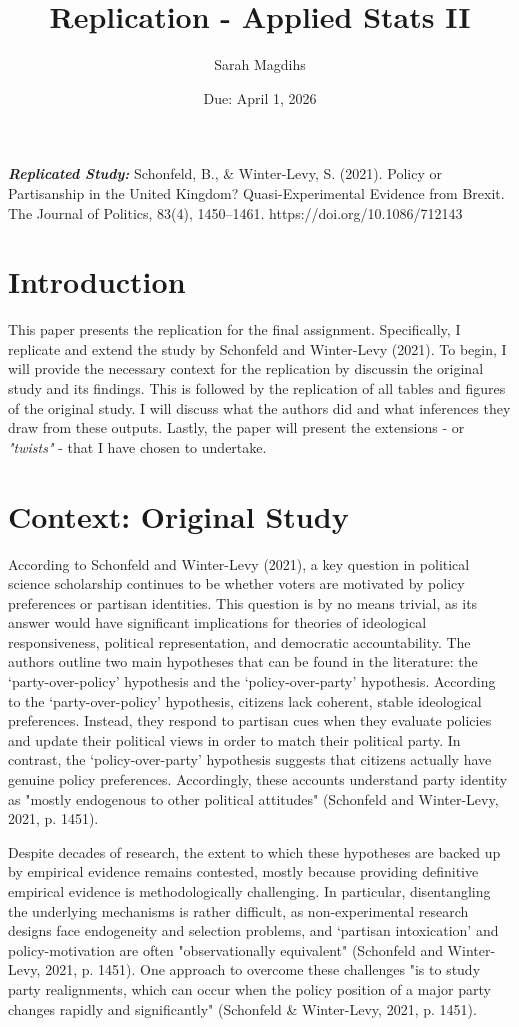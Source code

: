 \documentclass[12pt,letterpaper]{article}
\title{Replication - Applied Stats II}
\date{Due: April 1, 2026}
\author{Sarah Magdihs}
\begin{document}
	\maketitle
	\textbf{\textit{Replicated Study:}} Schonfeld, B., \& Winter-Levy, S. (2021). Policy or Partisanship in the United Kingdom? Quasi-Experimental Evidence from Brexit. The Journal of Politics, 83(4), 1450–1461. https://doi.org/10.1086/712143
	\section{Introduction}
	This paper presents the replication for the final assignment. Specifically, I replicate and extend the study by Schonfeld and Winter-Levy (2021). To begin, I will provide the necessary context for the replication by discussin the original study and its findings. This is followed by the replication of all tables and figures of the original study. I will discuss what the authors did and what inferences they draw from these outputs. Lastly, the paper will present the extensions - or \textit{"twists"} - that I have chosen to undertake.
	
	\section{Context: Original Study}
	According to Schonfeld and Winter-Levy (2021), a key question in political science scholarship continues to be whether voters are motivated by policy preferences or partisan identities. This question is by no means trivial, as its answer would have significant implications for theories of ideological responsiveness, political representation, and democratic accountability. The authors outline two main hypotheses that can be found in the literature: the ‘party-over-policy’ hypothesis and the ‘policy-over-party’ hypothesis. According to the ‘party-over-policy’ hypothesis, citizens lack coherent, stable ideological preferences. Instead, they respond to partisan cues when they evaluate policies and update their political views in order to match their political party. In contrast, the ‘policy-over-party’ hypothesis suggests that citizens actually have genuine policy preferences. Accordingly, these accounts understand party identity as "mostly endogenous to other political attitudes" (Schonfeld and Winter-Levy, 2021, p. 1451). 
	
	Despite decades of research, the extent to which these hypotheses are backed up by empirical evidence remains contested, mostly because providing definitive empirical evidence is methodologically challenging. In particular, disentangling the underlying mechanisms is rather difficult, as non-experimental research designs face endogeneity and selection problems, and ‘partisan intoxication’ and policy-motivation are often "observationally equivalent" (Schonfeld and Winter-Levy, 2021, p. 1451). One approach to overcome these challenges "is to study party realignments, which can occur when the policy position of a major party changes rapidly and significantly" (Schonfeld \& Winter-Levy, 2021, p. 1451). 
	
\end{document}
